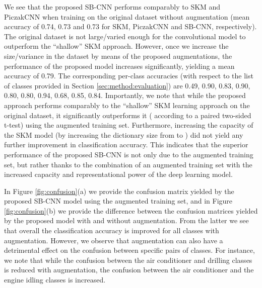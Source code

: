 \documentclass[journal,pdf]{IEEEtran}
\begin{document}
We see that the proposed SB-CNN performs comparably to SKM and PiczakCNN when training on the original dataset without augmentation (mean accuracy of 0.74, 0.73 and 0.73 for SKM, PiczakCNN and SB-CNN, respectively). The original dataset is not large/varied enough for the convolutional model to outperform the ``shallow'' SKM approach. However, once we increase the size/variance in the dataset by means of the proposed augmentations, the performance of the proposed model increases significantly, yielding a mean accuracy of 0.79. 
The corresponding per-class accuracies (with respect to the list of classes provided in Section 
\ref{sec:method:evaluation}) are 0.49, 0.90, 0.83, 0.90, 0.80, 0.80, 0.94, 0.68, 0.85, 0.84.
Importantly, we note that while the proposed approach performs comparably to the ``shallow'' SKM learning approach on the original dataset, it significantly outperforms it ( according to a paired two-sided t-test) using the augmented training set. 
Furthermore, increasing the capacity of the SKM model (by increasing the dictionary size from  to ) did not yield any further improvement in classification accuracy.
This indicates that the superior performance of the proposed SB-CNN is not only due to the augmented training set, but rather thanks to the combination of an augmented training set with the increased capacity and representational power of the deep learning model. 

In Figure \ref{fig:confusion}(a) we provide the confusion matrix yielded by the proposed SB-CNN model using the augmented training set, and in Figure \ref{fig:confusion}(b) we provide the difference between the confusion matrices yielded by the proposed model with and without augmentation. 
From the latter we see that 
overall the classification accuracy is improved for all classes with augmentation. 
However, we observe that augmentation can also have a detrimental effect on the confusion between specific pairs of classes. For instance, we note that while the confusion between the air conditioner and drilling classes is reduced with augmentation, the confusion between the air conditioner and the engine idling classes is increased.
\end{document}
